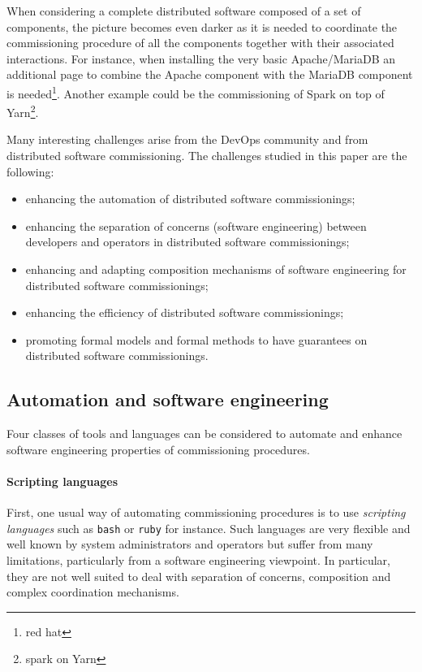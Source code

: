 When considering a complete distributed software composed of a set of
components, the picture becomes even darker as it is needed to
coordinate the commissioning procedure of all the components together
with their associated interactions. For instance, when installing the
very basic Apache/MariaDB an additional page to combine the Apache
component with the MariaDB component is needed\footnote{red
  hat}. Another example could be the commissioning of Spark on top of
Yarn\footnote{spark on Yarn}.

Many interesting challenges arise from the DevOps community and from
distributed software commissioning. The challenges studied in this
paper are the following:
\begin{itemize}
\item enhancing the automation of distributed software commissionings;
\item enhancing the separation of concerns (software engineering)
  between developers and operators in distributed software
  commissionings;
\item enhancing and adapting composition mechanisms of software
  engineering for distributed software commissionings;
\item enhancing the efficiency of distributed software commissionings;
\item promoting formal models and formal methods to have guarantees on
  distributed software commissionings.
\end{itemize}

\subsection{Automation and software engineering}

Four classes of tools and languages can be considered to automate and
enhance software engineering properties of commissioning procedures.

\paragraph{Scripting languages}
First, one usual way of automating commissioning procedures is to use
\emph{scripting languages} such as \texttt{bash} or \texttt{ruby} for
instance. Such languages are very flexible and well known by system
administrators and operators but suffer from many limitations,
particularly from a software engineering viewpoint. In particular,
they are not well suited to deal with separation of concerns,
composition and complex coordination mechanisms.

